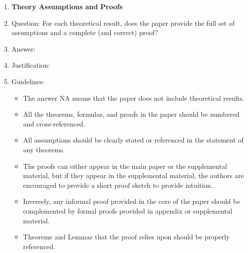 \documentclass{article} %
\newcounter{ct}
\theoremstyle{definition}
\theoremstyle{remark}
\begin{document}
\begin{enumerate}
\item {\bf Theory Assumptions and Proofs}
    \item[] Question: For each theoretical result, does the paper provide the full set of assumptions and a complete (and correct) proof?
    \item[] Answer: \answerTODO{} %
    \item[] Justification: \justificationTODO{}
    \item[] Guidelines:
    \begin{itemize}
        \item The answer NA means that the paper does not include theoretical results. 
        \item All the theorems, formulas, and proofs in the paper should be numbered and cross-referenced.
        \item All assumptions should be clearly stated or referenced in the statement of any theorems.
        \item The proofs can either appear in the main paper or the supplemental material, but if they appear in the supplemental material, the authors are encouraged to provide a short proof sketch to provide intuition. 
        \item Inversely, any informal proof provided in the core of the paper should be complemented by formal proofs provided in appendix or supplemental material.
        \item Theorems and Lemmas that the proof relies upon should be properly referenced. 
    \end{itemize}


\end{enumerate}
\end{document}
